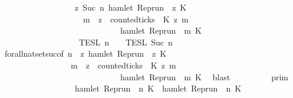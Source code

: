 \begin{isabellebody}
\ \ \ \ \ \ \ \ \ \ \ \ \ \ \ \ {\isasyminter}\ {\isacharbraceleft}{\isasymrho}{\isachardot}\ {\isasymforall}z{\isasymge}\ Suc\ n{\isachardot}\ hamlet\ {\isacharparenleft}{\isacharparenleft}Rep{\isacharunderscore}run\ {\isasymrho}{\isacharparenright}\ z\ K\ {\isasymlongrightarrow}\isanewline
\ \ \ \ \ \ \ \ \ \ \ \ \ \ \ \ \ \ \ \ {\isacharparenleft}{\isasymforall}m\ {\isasymge}\ z{\isachardot}\ \ counted{\isacharunderscore}ticks\ {\isasymrho}\ K\ z\ m\ {}\isanewline
\ \ \ \ \ \ \ \ \ \ \ \ \ \ \ \ \ \ \ \ \ \ \ \ \ \ \ \ {\isasymlongrightarrow}\ hamlet\ {\isacharparenleft}{\isacharparenleft}Rep{\isacharunderscore}run\ {\isasymrho}{\isacharparenright}\ m\ K\ {\isacharbraceright}\isanewline
\ \ \ \ \ \ \ \ \ \ \ \ \ \ \ \ {\isasyminter}\ {\isasymlbrakk}{\isasymlbrakk}\ {\isasymPsi}\ {\isasymrbrakk}{\isasymrbrakk}\isactrlsub T\isactrlsub E\isactrlsub S\isactrlsub L\isactrlbsup {\isasymge}\ n\isactrlesup \ {\isasyminter}\ {\isasymlbrakk}{\isasymlbrakk}\ {\isasymPhi}\ {\isasymrbrakk}{\isasymrbrakk}\isactrlsub T\isactrlsub E\isactrlsub S\isactrlsub L\isactrlbsup {\isasymge}\ Suc\ n\isactrlesup {\isacartoucheclose}\isanewline
\ \ \ \ \isamarkupfalse%
\ forall{\isacharunderscore}nat{\isacharunderscore}set{\isacharunderscore}suc{\isacharbrackleft}of\ {\isacartoucheopen}n{\isacartoucheclose}\ {\isacartoucheopen}{\isasymlambda}{\isasymrho}\ z{\isachardot}\ hamlet\ {\isacharparenleft}{\isacharparenleft}Rep{\isacharunderscore}run\ {\isasymrho}{\isacharparenright}\ z\ K\ {\isasymlongrightarrow}\isanewline
\ \ \ \ \ \ \ \ \ \ \ \ \ \ \ \ \ {\isacharparenleft}{\isasymforall}m\ {\isasymge}\ z{\isachardot}\ \ counted{\isacharunderscore}ticks\ {\isasymrho}\ K\ z\ m\ {}\isanewline
\ \ \ \ \ \ \ \ \ \ \ \ \ \ \ \ \ \ \ \ \ \ \ \ \ \ \ \ {\isasymlongrightarrow}\ hamlet\ {\isacharparenleft}{\isacharparenleft}Rep{\isacharunderscore}run\ {\isasymrho}{\isacharparenright}\ m\ K\ \isamarkupfalse%
\ blast\isanewline
\ \ \isamarkupfalse%
\ \isamarkupfalse%
\ {\isacartoucheopen}{\isachardot}{\isachardot}{\isachardot}\ {\isacharequal}\ {\isasymlbrakk}{\isasymlbrakk}\ {\isasymGamma}\ {\isasymrbrakk}{\isasymrbrakk}\isactrlsub p\isactrlsub r\isactrlsub i\isactrlsub m\isanewline
\ \ \ \ \ \ \ \ \ \ \ \ \ \ \ \ {\isasyminter}\ {\isacharbraceleft}{\isasymrho}{\isachardot}\ hamlet\ {\isacharparenleft}{\isacharparenleft}Rep{\isacharunderscore}run\ {\isasymrho}{\isacharparenright}\ n\ K\ {\isasymlongrightarrow}\ hamlet\ {\isacharparenleft}{\isacharparenleft}Rep{\isacharunderscore}run\ {\isasymrho}{\isacharparenright}\ n\ K\ {\isacharbraceright}\isanewline

\end{isabellebody}
